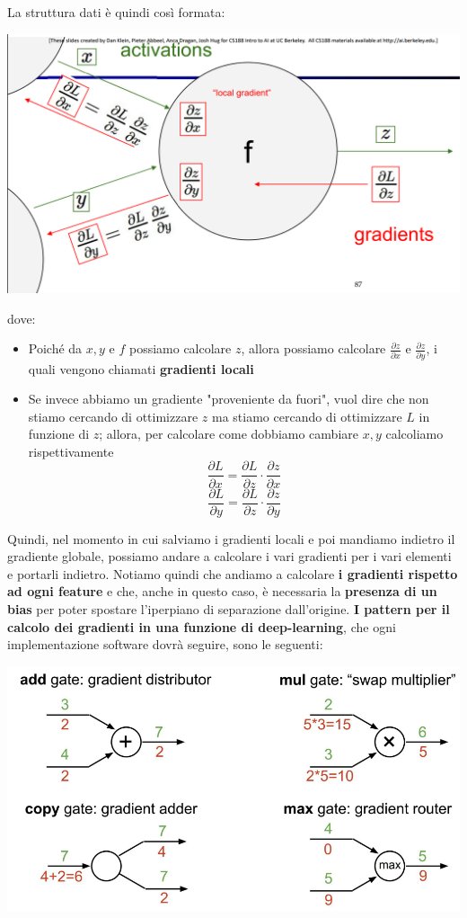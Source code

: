 \documentclass[12pt]{article}
\begin{document}
La struttura dati è quindi così formata:
\begin{center}
    \includegraphics[width =0.70\linewidth]{Images/126.PNG}
\end{center}
dove:
\begin{itemize}
    \item Poiché da $x, y$ e $f$ possiamo calcolare $z$, allora possiamo calcolare $\frac{\partial z}{\partial x}$ e $\frac{\partial z}{\partial y}$, i quali vengono chiamati \textbf{gradienti locali}
    \item Se invece abbiamo un gradiente "proveniente da fuori", vuol dire che non stiamo cercando di ottimizzare $z$ ma stiamo cercando di ottimizzare $L$ in funzione di $z$; allora, per calcolare come dobbiamo cambiare $x, y$ calcoliamo rispettivamente
     $$\frac{\partial L}{\partial x} = \frac{\partial L}{\partial z} \cdot \frac{\partial z}{\partial x}$$
     $$\frac{\partial L}{\partial y} = \frac{\partial L}{\partial z} \cdot \frac{\partial z}{\partial y}$$
\end{itemize}
Quindi, nel momento in cui salviamo i gradienti locali e poi mandiamo indietro il gradiente globale, possiamo andare a calcolare i vari gradienti per i vari elementi e portarli indietro.
Notiamo quindi che andiamo a calcolare \textbf{i gradienti rispetto ad ogni feature} e che, anche in questo caso, è necessaria la \textbf{presenza di un bias} per poter spostare l'iperpiano di separazione dall'origine.
\textbf{I pattern per il calcolo dei gradienti in una funzione di deep-learning}, che ogni implementazione software dovrà seguire, sono le seguenti:
\begin{center}
    \includegraphics[width =0.70\linewidth]{Images/127.PNG}
\end{center}
\end{document}
